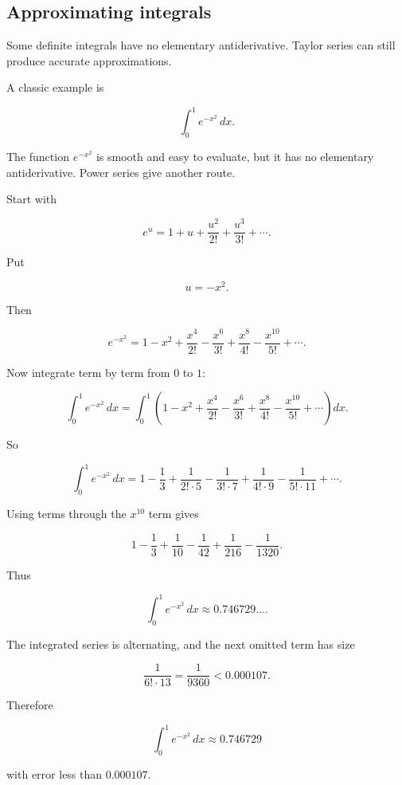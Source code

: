 \subsection{Approximating integrals}
\label{subsec:approximating-integrals-taylor}

Some definite integrals have no elementary antiderivative.  Taylor series can still produce
accurate approximations.

A classic example is

\[
\int_0^1 e^{-x^2}\,dx.
\]

The function \(e^{-x^2}\) is smooth and easy to evaluate, but it has no elementary
antiderivative.  Power series give another route.

Start with

\[
e^u=
1+u+\frac{u^2}{2!}+\frac{u^3}{3!}+\cdots.
\]

Put

\[
u=-x^2.
\]

Then

\[
e^{-x^2}
=
1-x^2+\frac{x^4}{2!}-\frac{x^6}{3!}
+\frac{x^8}{4!}-\frac{x^{10}}{5!}+\cdots.
\]

Now integrate term by term from \(0\) to \(1\):

\[
\int_0^1 e^{-x^2}\,dx
=
\int_0^1
\left(
1-x^2+\frac{x^4}{2!}-\frac{x^6}{3!}
+\frac{x^8}{4!}-\frac{x^{10}}{5!}+\cdots
\right)dx.
\]

So

\[
\int_0^1 e^{-x^2}\,dx
=
1-\frac13+\frac{1}{2!\cdot5}
-\frac{1}{3!\cdot7}
+\frac{1}{4!\cdot9}
-\frac{1}{5!\cdot11}
+\cdots.
\]

Using terms through the \(x^{10}\) term gives

\[
1-\frac13+\frac1{10}-\frac1{42}
+\frac1{216}-\frac1{1320}.
\]

Thus

\[
\int_0^1 e^{-x^2}\,dx
\approx
0.746729\ldots.
\]

The integrated series is alternating, and the next omitted term has size

\[
\frac{1}{6!\cdot 13}
=
\frac1{9360}
<0.000107.
\]

Therefore

\[
\boxed{
\int_0^1 e^{-x^2}\,dx
\approx0.746729
}
\]

with error less than \(0.000107\).

